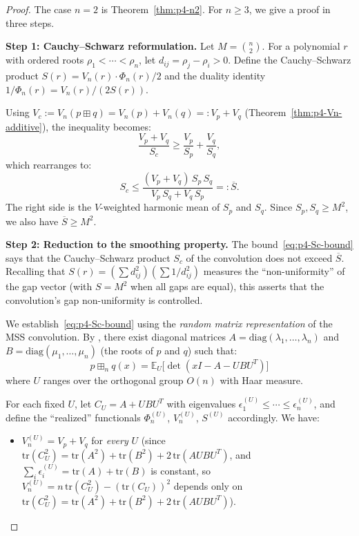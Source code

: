 \begin{proof}
The case $n = 2$ is Theorem~\ref{thm:p4-n2}. For $n \geq 3$, we give a
proof in three steps.

\medskip
\noindent\textbf{Step 1: Cauchy--Schwarz reformulation.}
Let $M = \binom{n}{2}$. For a polynomial $r$ with ordered roots
$\rho_1 < \cdots < \rho_n$, let $d_{ij} = \rho_j - \rho_i > 0$.
Define the Cauchy--Schwarz product $S(r) = V_n(r) \cdot \Phi_n(r)/2$
and the duality identity $1/\Phi_n(r) = V_n(r)/(2 S(r))$.

Using $V_c := V_n(p \boxplus q) = V_n(p) + V_n(q) =: V_p + V_q$
(Theorem~\ref{thm:p4-Vn-additive}), the inequality becomes:
\begin{equation}\label{eq:p4-reformulated}
\frac{V_p + V_q}{S_c} \geq \frac{V_p}{S_p} + \frac{V_q}{S_q},
\end{equation}
which rearranges to:
\begin{equation}\label{eq:p4-Sc-bound}
S_c \leq \frac{(V_p + V_q)\, S_p\, S_q}{V_p\, S_q + V_q\, S_p}
=: \overline{S}.
\end{equation}
The right side is the $V$-weighted harmonic mean of $S_p$ and $S_q$.
Since $S_p, S_q \geq M^2$, we also have $\overline{S} \geq M^2$.

\medskip
\noindent\textbf{Step 2: Reduction to the smoothing property.}
The bound~\eqref{eq:p4-Sc-bound} says that the Cauchy--Schwarz product
$S_c$ of the convolution does not exceed $\overline{S}$. Recalling that
$S(r) = (\sum d_{ij}^2)(\sum 1/d_{ij}^2)$ measures the ``non-uniformity''
of the gap vector (with $S = M^2$ when all gaps are equal), this asserts
that the convolution's gap non-uniformity is controlled.

We establish~\eqref{eq:p4-Sc-bound} using the \emph{random matrix
representation} of the MSS convolution. By \cite{MSS22}, there exist
diagonal matrices $A = \mathrm{diag}(\lambda_1, \ldots, \lambda_n)$
and $B = \mathrm{diag}(\mu_1, \ldots, \mu_n)$ (the roots of $p$ and $q$)
such that:
\begin{equation}\label{eq:p4-rmt}
p \boxplus_n q(x) = \mathbb{E}_U\!\bigl[\det(xI - A - UBU^T)\bigr]
\end{equation}
where $U$ ranges over the orthogonal group $O(n)$ with Haar measure.

For each fixed $U$, let $C_U = A + UBU^T$ with eigenvalues
$\epsilon_1^{(U)} \leq \cdots \leq \epsilon_n^{(U)}$, and define the
``realized'' functionals $\Phi_n^{(U)}$, $V_n^{(U)}$, $S^{(U)}$
accordingly. We have:
\begin{itemize}
\item $V_n^{(U)} = V_p + V_q$ for \emph{every} $U$ (since
  $\mathrm{tr}(C_U^2) = \mathrm{tr}(A^2) + \mathrm{tr}(B^2) + 2\,\mathrm{tr}(AUBU^T)$,
  and $\sum_i \epsilon_i^{(U)} = \mathrm{tr}(A) + \mathrm{tr}(B)$ is
  constant, so $V_n^{(U)} = n\, \mathrm{tr}(C_U^2) - (\mathrm{tr}(C_U))^2$
  depends only on $\mathrm{tr}(C_U^2) = \mathrm{tr}(A^2) + \mathrm{tr}(B^2)
  + 2\, \mathrm{tr}(AUBU^T)$).


\end{itemize}
\end{proof}
